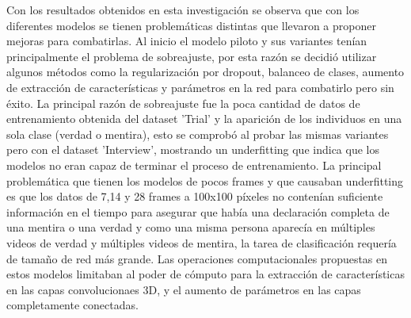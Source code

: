 \begin{onehalfspacing}
Con los resultados obtenidos en esta investigación se observa que con los diferentes modelos se tienen problemáticas distintas que llevaron a proponer mejoras para combatirlas.
Al inicio el modelo piloto y sus variantes tenían principalmente el problema de sobreajuste, por esta razón se decidió utilizar algunos métodos como la regularización por dropout, balanceo de clases, aumento de extracción de características y  parámetros en la red para combatirlo pero sin éxito. La principal razón de sobreajuste fue la poca cantidad de datos de entrenamiento obtenida del dataset 'Trial' y la aparición de los individuos en una sola clase (verdad o mentira), esto se comprobó al probar las mismas variantes pero con el dataset 'Interview', mostrando un underfitting que indica que los modelos no eran capaz de terminar el proceso de entrenamiento. La principal problemática que tienen los modelos de pocos frames y que causaban underfitting es que los datos de 7,14 y 28 frames a 100x100 píxeles no contenían suficiente información en el tiempo para asegurar que había una declaración completa de una mentira o una verdad y como una misma persona aparecía en múltiples videos de verdad y múltiples videos de mentira, la tarea de clasificación requería de tamaño de red más grande. Las operaciones computacionales propuestas en estos modelos limitaban al poder de cómputo para la extracción de características en las capas convolucionaes 3D, y el aumento de parámetros en las capas completamente conectadas. 

\end{onehalfspacing}
